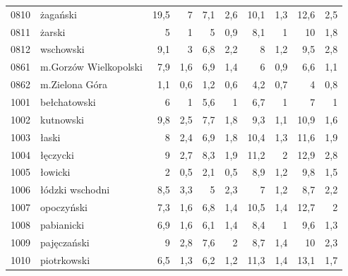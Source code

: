 \begin{center}
\begin{longtable}{lp{3cm}rrrrrrrr}
0810 & żagański                & 19,5    & 7           & 7,1      & 2,6          & 10,1     & 1,3          & 12,6     & 2,5          \\
0811 & żarski                  & 5       & 1           & 5        & 0,9          & 8,1      & 1            & 10       & 1,8          \\
0812 & wschowski               & 9,1     & 3           & 6,8      & 2,2          & 8        & 1,2          & 9,5      & 2,8          \\
0861 & m.Gorzów Wielkopolski   & 7,9     & 1,6         & 6,9      & 1,4          & 6        & 0,9          & 6,6      & 1,1          \\
0862 & m.Zielona Góra          & 1,1     & 0,6         & 1,2      & 0,6          & 4,2      & 0,7          & 4        & 0,8          \\
1001 & bełchatowski            & 6       & 1           & 5,6      & 1            & 6,7      & 1            & 7        & 1            \\
1002 & kutnowski               & 9,8     & 2,5         & 7,7      & 1,8          & 9,3      & 1,1          & 10,9     & 1,6          \\
1003 & łaski                   & 8       & 2,4         & 6,9      & 1,8          & 10,4     & 1,3          & 11,6     & 1,9          \\
1004 & łęczycki                & 9       & 2,7         & 8,3      & 1,9          & 11,2     & 2            & 12,9     & 2,8          \\
1005 & łowicki                 & 2       & 0,5         & 2,1      & 0,5          & 8,9      & 1,2          & 9,8      & 1,5          \\
1006 & łódzki wschodni         & 8,5     & 3,3         & 5        & 2,3          & 7        & 1,2          & 8,7      & 2,2          \\
1007 & opoczyński              & 7,3     & 1,6         & 6,8      & 1,4          & 10,5     & 1,4          & 12,7     & 2            \\
1008 & pabianicki              & 6,9     & 1,6         & 6,1      & 1,4          & 8,4      & 1            & 9,6      & 1,3          \\
1009 & pajęczański             & 9       & 2,8         & 7,6      & 2            & 8,7      & 1,4          & 10       & 2,3          \\
1010 & piotrkowski             & 6,5     & 1,3         & 6,2      & 1,2          & 11,3     & 1,4          & 13,1     & 1,7          \\

\end{longtable}
\end{center}
